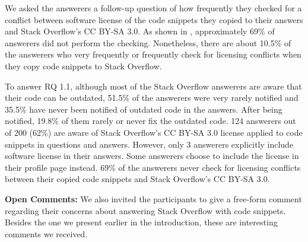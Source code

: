 \documentclass[10pt,journal,compsoc]{IEEEtran}
\newenvironment{boxquote}{\vspace{-1ex}\setlength{\FrameSep}{1\fboxsep}\begin{framed}\setlength{\parskip}{0.5\baselineskip}\setlength{\parindent}{0pt}}{\end{framed}}
\begin{document}
We asked the answerers a follow-up question of how frequently they checked for a
conflict between software license of the code snippets they copied to their
answers and Stack Overflow's CC BY-SA 3.0. As shown in
, approximately 69\% of answerers did not perform
the checking. Nonetheless, there are about 10.5\% of the answerers who very
frequently or frequently check for licensing conflicts when they copy code
snippets to Stack Overflow.


\begin{boxquote}
	To answer RQ 1.1, although most of the Stack Overflow answerers are aware that their code
	can be outdated, 51.5\% of the answerers were very rarely notified and 35.5\% have never been notified of
	outdated code in the answers. After being notified, 19.8\% of them rarely or never fix the outdated code.
	124 answerers out of 200 (62\%) are aware of Stack Overflow's
	CC BY-SA 3.0 license applied to code snippets in questions and answers. However,
	only 3 answerers explicitly include software license in their answers. Some 
	answerers choose to include the license in their profile page instead. 69\% of the
	answerers never check for licensing conflicts between their copied code snippets
	and Stack Overflow's CC BY-SA 3.0.
\end{boxquote}

\textbf{Open Comments:} We also invited the participants to give a
free-form comment regarding their concerns about answering Stack Overflow with code
snippets. Besides the one we present earlier in the introduction, these are
interesting comments we received.
\end{document}
